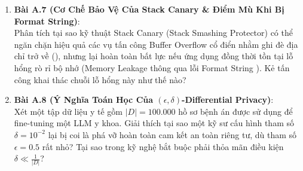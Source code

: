 \begin{enumerate}
  \item \textbf{Bài A.7 (Cơ Chế Bảo Vệ Của Stack Canary \& Điểm Mù Khi Bị Format String)}: \\
  Phân tích tại sao kỹ thuật Stack Canary (Stack Smashing Protector) có thể ngăn chặn hiệu quả các vụ tấn công Buffer Overflow cổ điển nhằm ghi đè địa chỉ trở về (), nhưng lại hoàn toàn bất lực nếu ứng dụng đồng thời tồn tại lỗ hổng rò rỉ bộ nhớ (Memory Leakage thông qua lỗi Format String ). Kẻ tấn công khai thác chuỗi lỗ hổng này như thế nào?

  \item \textbf{Bài A.8 (Ý Nghĩa Toán Học Của $(\epsilon, \delta)$-Differential Privacy)}: \\
  Xét một tập dữ liệu y tế gồm $|D| = 100.000$ hồ sơ bệnh án được sử dụng để fine-tuning một LLM y khoa.
  Giải thích tại sao một kỹ sư cấu hình tham số $\delta = 10^{-2}$ lại bị coi là phá vỡ hoàn toàn cam kết an toàn riêng tư, dù tham số $\epsilon = 0.5$ rất nhỏ? Tại sao trong kỹ nghệ bắt buộc phải thỏa mãn điều kiện $\delta \ll \frac{1}{|D|}$?
\end{enumerate}


